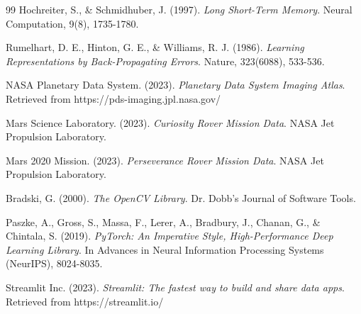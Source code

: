 \documentclass[12pt]{article}
\begin{document}
\begin{thebibliography}{99}
Hochreiter, S., \& Schmidhuber, J. (1997).
\textit{Long Short-Term Memory}.
Neural Computation, 9(8), 1735-1780.

Rumelhart, D. E., Hinton, G. E., \& Williams, R. J. (1986).
\textit{Learning Representations by Back-Propagating Errors}.
Nature, 323(6088), 533-536.

NASA Planetary Data System. (2023).
\textit{Planetary Data System Imaging Atlas}.
Retrieved from https://pds-imaging.jpl.nasa.gov/

Mars Science Laboratory. (2023).
\textit{Curiosity Rover Mission Data}.
NASA Jet Propulsion Laboratory.

Mars 2020 Mission. (2023).
\textit{Perseverance Rover Mission Data}.
NASA Jet Propulsion Laboratory.

Bradski, G. (2000).
\textit{The OpenCV Library}.
Dr. Dobb's Journal of Software Tools.

Paszke, A., Gross, S., Massa, F., Lerer, A., Bradbury, J., Chanan, G., \& Chintala, S. (2019).
\textit{PyTorch: An Imperative Style, High-Performance Deep Learning Library}.
In Advances in Neural Information Processing Systems (NeurIPS), 8024-8035.

Streamlit Inc. (2023).
\textit{Streamlit: The fastest way to build and share data apps}.
Retrieved from https://streamlit.io/

\end{thebibliography}
\end{document}
